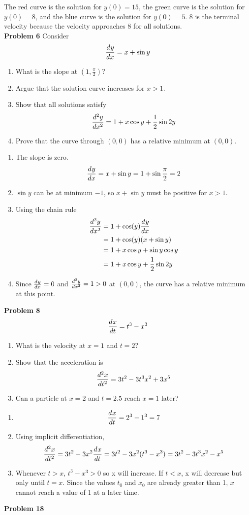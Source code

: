 The red curve is the solution for $y(0) = 15$,
the green curve is the solution for $y(0) = 8$,
and the blue curve is the solution for $y(0) = 5$.
8 is the terminal velocity because the velocity approaches 8
for all solutions. \\
\textbf{Problem 6}
Consider 
\[
    \der{y}{x} = x + \sin y
\]
\begin{enumerate}
    \item What is the slope at $(1, \frac{\pi}{2})$?
    \item Argue that the solution curve increases for $x>1$.
    \item Show that all solutions satisfy 
        \[
            \der[2]{y}{x} = 1 + x\cos y + \frac{1}{2} \sin 2y
        \]
    \item Prove that the curve through $(0, 0)$ has a relative minimum at $(0,0)$.
\end{enumerate}
\solution 
\begin{enumerate}
    \item The slope is zero.
    \[
        \der{y}{x} = x + \sin y = 1 + \sin \frac{\pi}{2} = 2
    \]
    \item $\sin y$ can be at minimum $-1$, so 
        $x + \sin y$ must be positive for $x > 1$.
    \item Using the chain rule 
        \begin{align*}
            \der[2]{y}{x} 
            &= 1 + \cos(y) \der{y}{x} \\
            &= 1 + \cos(y)(x + \sin y) \\
            &= 1 + x\cos y + \sin y \cos y \\
            &= 1 + x\cos y + \frac{1}{2} \sin 2y
        \end{align*}
    \item Since $\der{y}{x} = 0$ and $\der[2]{y}{x} = 1 > 0$
        at $(0,0)$, the curve has a relative minimum at this point.
\end{enumerate}
\textbf{Problem 8}
\[
    \der{x}{t} = t^3 - x^3
\]
\begin{enumerate}
    \item What is the velocity at $x=1$ and $t=2$?
    \item Show that the acceleration is
        \[
            \der[2]{x}{t} = 3t^2 - 3t^3x^2 + 3x^5
        \]
    \item Can a particle at $x=2$ and $t=2.5$ 
        reach $x=1$ later?
\end{enumerate}
\solution 
\begin{enumerate}
    \item 
        \[
            \der{x}{t} = 2^3 - 1^3 = 7
        \]
    \item Using implicit differentiation,
        \[
            \der[2]{x}{t} 
            = 3t^2 - 3x^2 \der{x}{t}
            = 3t^2 - 3x^2(t^3 - x^3)
            = 3t^2 -3t^3x^2 - x^5
        \]
    \item Whenever $t > x$, $t^3-x^3 > 0$ so x will increase.
        If $t < x$, x will decrease but only until $t = x$.
        Since the values $t_0$ and $x_0$ are already greater than 1,
        $x$ cannot reach a value of 1 at a later time.
\end{enumerate}
\textbf{Problem 18}

